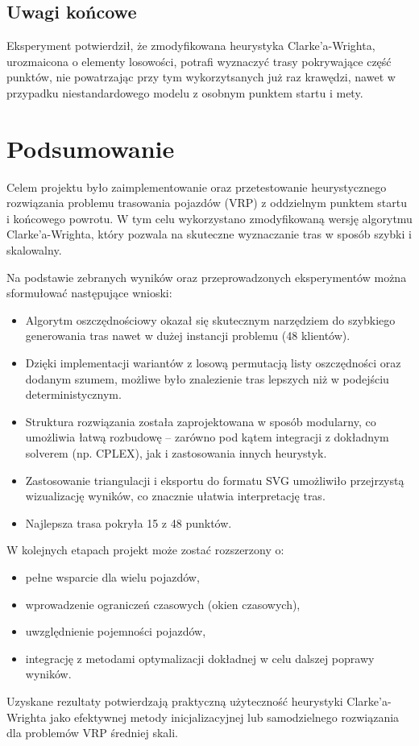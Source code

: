 \documentclass{article}
\begin{document}
\subsection*{Uwagi końcowe}

Eksperyment potwierdził, że zmodyfikowana heurystyka Clarke’a-Wrighta, urozmaicona o elementy losowości, potrafi wyznaczyć trasy pokrywające część punktów, nie powatrzając przy tym wykorzytsanych już raz krawędzi, nawet w przypadku niestandardowego modelu z osobnym punktem startu i mety.
\section{Podsumowanie}

Celem projektu było zaimplementowanie oraz przetestowanie heurystycznego rozwiązania problemu trasowania pojazdów (VRP) z oddzielnym punktem startu i końcowego powrotu. W tym celu wykorzystano zmodyfikowaną wersję algorytmu Clarke’a-Wrighta, który pozwala na skuteczne wyznaczanie tras w sposób szybki i skalowalny.

Na podstawie zebranych wyników oraz przeprowadzonych eksperymentów można sformułować następujące wnioski:

\begin{itemize}
    \item Algorytm oszczędnościowy okazał się skutecznym narzędziem do szybkiego generowania tras nawet w dużej instancji problemu (48 klientów).
    \item Dzięki implementacji wariantów z losową permutacją listy oszczędności oraz dodanym szumem, możliwe było znalezienie tras lepszych niż w podejściu deterministycznym.
    \item Struktura rozwiązania została zaprojektowana w sposób modularny, co umożliwia łatwą rozbudowę – zarówno pod kątem integracji z dokładnym solverem (np. CPLEX), jak i zastosowania innych heurystyk.
    \item Zastosowanie triangulacji i eksportu do formatu SVG umożliwiło przejrzystą wizualizację wyników, co znacznie ułatwia interpretację tras.
    \item Najlepsza trasa pokryła 15 z 48 punktów.
\end{itemize}

W kolejnych etapach projekt może zostać rozszerzony o:
\begin{itemize}
    \item pełne wsparcie dla wielu pojazdów,
    \item wprowadzenie ograniczeń czasowych (okien czasowych),
    \item uwzględnienie pojemności pojazdów,
    \item integrację z metodami optymalizacji dokładnej w celu dalszej poprawy wyników.
\end{itemize}

Uzyskane rezultaty potwierdzają praktyczną użyteczność heurystyki Clarke’a-Wrighta jako efektywnej metody inicjalizacyjnej lub samodzielnego rozwiązania dla problemów VRP średniej skali.
\end{document}
